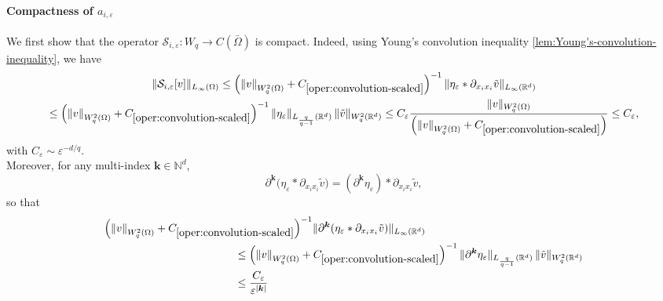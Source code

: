 \documentclass[final,onefignum,onetabnum]{mousaviart}
\newcounter{example}
\begin{document}
\begin{example}
		\paragraph{ Compactness of $a_{i,\varepsilon}$}  
		We first show that the operator $\mathcal{S}_{i,\varepsilon} : W_q \to C(\bar{\Omega})$ is compact. Indeed, using Young's convolution inequality \eqref{lem:Young's-convolution-inequality}, we have
		\begin{multline}
			\label{ineq:uniform-boundedness-convolution-scaled}
			\| \mathcal{S}_{i,\varepsilon}[v] \|_{L_\infty(\Omega)}
			\le 
			\left( \left\| v \right\|_{W^{2}_q(\Omega)} + C_{\ref{oper:convolution-scaled}} \right)^{-1}
			\| \eta_{\varepsilon} \ast \partial_{x_i x_i} \tilde{v} \|_{L_\infty(\mathbb{R}^d)}
			\\
			\le 
			\left( \left\| v \right\|_{W^{2}_q(\Omega)} + C_{\ref{oper:convolution-scaled}} \right)^{-1}
			\| \eta_{\varepsilon} \|_{L_{\frac{q}{q-1}}(\mathbb{R}^d)} \, \| \tilde{v} \|_{W^{2}_q(\mathbb{R}^d)}
			\le C_{\varepsilon} 
			\frac{ \| v
				\|_{W^{2}_q(\Omega)}}{\left( \left\| v \right\|_{W^{2}_q(\Omega)} + C_{\ref{oper:convolution-scaled}} \right)}
			\le
			C_{\varepsilon} ,
		\end{multline}
		with $C_{\varepsilon} \sim {\varepsilon}^{-d/q}$.  
		\\
		Moreover, for any multi-index $\boldsymbol{k} \in \mathbb{N}^d$,
		\[
		\partial^{\boldsymbol{k}} \bigl(\eta_{\varepsilon} \ast \partial_{x_i x_i} \tilde{v} \bigr)
		= (\partial^{\boldsymbol{k}} \eta_{\varepsilon}) \ast \partial_{x_i x_i} \tilde{v},
		\]
		so that
		\begin{equation}
			\label{ineq:upper-bound-derivative-S-scaled}
			\begin{aligned}
			\left( \left\| v \right\|_{W^{2}_q(\Omega)} + C_{\ref{oper:convolution-scaled}} \right)^{-1}
			&
			\|\partial^{\boldsymbol{k}} (\eta_{\varepsilon} \ast \partial_{x_i x_i} \tilde{v})\|_{L_\infty(\mathbb{R}^d)} 
			\\
			& \hspace*{-2.5cm} \le
			\left( \left\| v \right\|_{W^{2}_q(\Omega)} + C_{\ref{oper:convolution-scaled}} \right)^{-1} \|\partial^{\boldsymbol{k}} \eta_{\varepsilon}\|_{L_{\frac{q}{q-1}}(\mathbb{R}^d)} \, \|\tilde{v}\|_{W^{2}_q(\mathbb{R}^d)}
			\\
			& \hspace*{-2.5cm} \le
			\frac{ C_{\varepsilon}}{{\varepsilon}^{|\boldsymbol{k}|}}

\end{aligned}
\end{equation}
\end{example}
\end{document}

